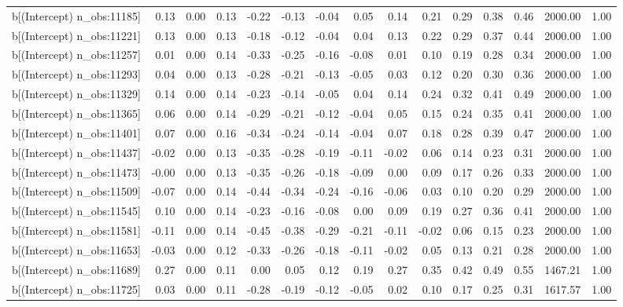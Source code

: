 \begin{table}[ht]
\begin{tabular}{rrrrrrrrrrrrrrr}
  b[(Intercept) n\_obs:11185] & 0.13 & 0.00 & 0.13 & -0.22 & -0.13 & -0.04 & 0.05 & 0.14 & 0.21 & 0.29 & 0.38 & 0.46 & 2000.00 & 1.00 \\ 
  b[(Intercept) n\_obs:11221] & 0.13 & 0.00 & 0.13 & -0.18 & -0.12 & -0.04 & 0.04 & 0.13 & 0.22 & 0.29 & 0.37 & 0.44 & 2000.00 & 1.00 \\ 
  b[(Intercept) n\_obs:11257] & 0.01 & 0.00 & 0.14 & -0.33 & -0.25 & -0.16 & -0.08 & 0.01 & 0.10 & 0.19 & 0.28 & 0.34 & 2000.00 & 1.00 \\ 
  b[(Intercept) n\_obs:11293] & 0.04 & 0.00 & 0.13 & -0.28 & -0.21 & -0.13 & -0.05 & 0.03 & 0.12 & 0.20 & 0.30 & 0.36 & 2000.00 & 1.00 \\ 
  b[(Intercept) n\_obs:11329] & 0.14 & 0.00 & 0.14 & -0.23 & -0.14 & -0.05 & 0.04 & 0.14 & 0.24 & 0.32 & 0.41 & 0.49 & 2000.00 & 1.00 \\ 
  b[(Intercept) n\_obs:11365] & 0.06 & 0.00 & 0.14 & -0.29 & -0.21 & -0.12 & -0.04 & 0.05 & 0.15 & 0.24 & 0.35 & 0.41 & 2000.00 & 1.00 \\ 
  b[(Intercept) n\_obs:11401] & 0.07 & 0.00 & 0.16 & -0.34 & -0.24 & -0.14 & -0.04 & 0.07 & 0.18 & 0.28 & 0.39 & 0.47 & 2000.00 & 1.00 \\ 
  b[(Intercept) n\_obs:11437] & -0.02 & 0.00 & 0.13 & -0.35 & -0.28 & -0.19 & -0.11 & -0.02 & 0.06 & 0.14 & 0.23 & 0.31 & 2000.00 & 1.00 \\ 
  b[(Intercept) n\_obs:11473] & -0.00 & 0.00 & 0.13 & -0.35 & -0.26 & -0.18 & -0.09 & 0.00 & 0.09 & 0.17 & 0.26 & 0.33 & 2000.00 & 1.00 \\ 
  b[(Intercept) n\_obs:11509] & -0.07 & 0.00 & 0.14 & -0.44 & -0.34 & -0.24 & -0.16 & -0.06 & 0.03 & 0.10 & 0.20 & 0.29 & 2000.00 & 1.00 \\ 
  b[(Intercept) n\_obs:11545] & 0.10 & 0.00 & 0.14 & -0.23 & -0.16 & -0.08 & 0.00 & 0.09 & 0.19 & 0.27 & 0.36 & 0.41 & 2000.00 & 1.00 \\ 
  b[(Intercept) n\_obs:11581] & -0.11 & 0.00 & 0.14 & -0.45 & -0.38 & -0.29 & -0.21 & -0.11 & -0.02 & 0.06 & 0.15 & 0.23 & 2000.00 & 1.00 \\ 
  b[(Intercept) n\_obs:11653] & -0.03 & 0.00 & 0.12 & -0.33 & -0.26 & -0.18 & -0.11 & -0.02 & 0.05 & 0.13 & 0.21 & 0.28 & 2000.00 & 1.00 \\ 
  b[(Intercept) n\_obs:11689] & 0.27 & 0.00 & 0.11 & 0.00 & 0.05 & 0.12 & 0.19 & 0.27 & 0.35 & 0.42 & 0.49 & 0.55 & 1467.21 & 1.00 \\ 
  b[(Intercept) n\_obs:11725] & 0.03 & 0.00 & 0.11 & -0.28 & -0.19 & -0.12 & -0.05 & 0.02 & 0.10 & 0.17 & 0.25 & 0.31 & 1617.57 & 1.00 \\ 

\end{tabular}
\end{table}
